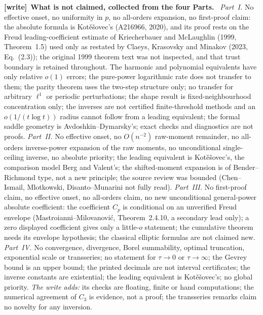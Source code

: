 \documentclass[11pt,letterpaper]{article}
\numberwithin{equation}{section}
\theoremstyle{remark}\newtheorem{remark}[theorem]{Remark}
\newenvironment{writenote}[1][]{\par\smallskip\begingroup\small
 \noindent\textbf{[write]}\if\relax\detokenize{#1}\relax\else~\textbf{#1.}\fi\ }%
 {\par\endgroup\smallskip}
\begin{document}
\begin{writenote}[What is not claimed, collected from the four Parts]
\emph{Part~I.} No effective onset, no uniformity in $p$, no all-orders
expansion, no first-proof claim: the absolute formula is Kot\v e\v sovec's
(A216966, 2020), and its proof rests on the Freud leading-coefficient
estimate of Kriecherbauer and McLaughlin (1999, Theorem~1.5) used only as
restated by Claeys, Krasovsky and Minakov (2023, Eq.~(2.3)); the original
1999 theorem text was not inspected, and that trust boundary is retained
throughout. The harmonic and polynomial equivalents have only relative $o(1)$
errors; the pure-power logarithmic rate does not transfer to them; the
parity theorem uses the two-step structure only; no transfer for arbitrary
$\ell^1$ or periodic perturbations; the shape result is fixed-neighbourhood
concentration only; the inverses are not certified finite-threshold
methods and an $o(1/(t\log t))$ radius cannot follow from a leading
equivalent; the formal saddle geometry is Avdoshkin--Dymarsky's; exact checks
and diagnostics are not proofs. \emph{Part~II.} No effective onset, no
$O(n^{-2})$ raw-moment remainder, no all-orders inverse-power expansion of the
raw moments, no unconditional single-ceiling inverse, no absolute priority;
the leading equivalent is Kot\v e\v sovec's, the comparison model Berg and
Valent's; the shifted-moment expansion is of Bender--Richmond type, not a new
principle; the source review was bounded (Chen--Ismail, Mlotkowski,
Disanto--Munarini not fully read). \emph{Part~III.} No first-proof claim, no
effective onset, no all-orders claim, no new unconditional general-power
absolute coefficient: the coefficient $C_p$ is conditional on an unverified
Freud envelope (Mastroianni--Milovanovi\'c, Theorem~2.4.10, a secondary lead
only); a zero displayed coefficient gives only a little-$o$ statement; the
cumulative theorem needs its envelope hypothesis; the classical elliptic
formulas are not claimed new. \emph{Part~IV.} No convergence, divergence,
Borel summability, optimal truncation, exponential scale or transseries; no
statement for $\tau\to0$ or $\tau\to\infty$; the Gevrey bound is an upper
bound; the printed decimals are not interval certificates; the inverse
constants are existential; the leading equivalent is Kot\v e\v sovec's;
no global priority. \emph{The write adds:} its checks are floating, finite or
hand computations; the numerical agreement of $C_3$ is evidence, not a
proof; the transseries remarks claim no novelty for any inversion.
\end{writenote}
\end{document}
